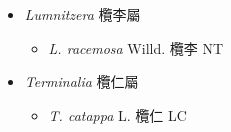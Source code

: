 
  \begin{itemize}
 \item[] \textit{Lumnitzera} 欖李屬
                                
  \begin{itemize}
        \item[] \textit{L. racemosa} Willd.  欖李   NT
  \end{itemize}
 \item[] \textit{Terminalia} 欖仁屬
                                
  \begin{itemize}
        \item[] \textit{T. catappa} L.  欖仁   LC
  \end{itemize}
  \end{itemize}
